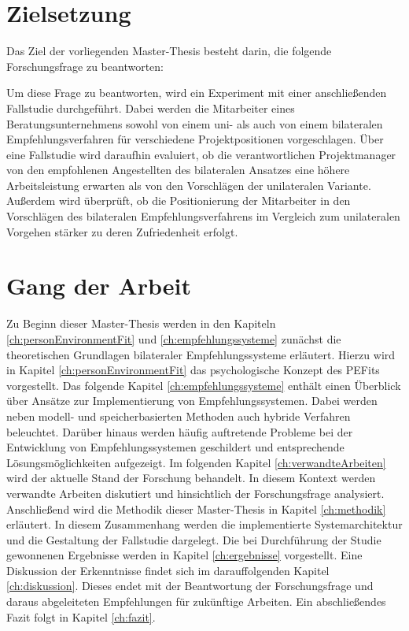 \newpage
\section{Zielsetzung}
\label{sec:intro:zielsetzung}
Das Ziel der vorliegenden Master-Thesis besteht darin, die folgende Forschungsfrage zu beantworten:

\forschungsfrage

Um diese Frage zu beantworten, wird ein Experiment mit einer anschließenden Fallstudie durchgeführt. Dabei werden die Mitarbeiter eines Beratungsunternehmens sowohl von einem uni- als auch von einem bilateralen Empfehlungsverfahren für verschiedene Projektpositionen vorgeschlagen. Über eine Fallstudie wird daraufhin evaluiert, ob die verantwortlichen Projektmanager von den empfohlenen Angestellten des bilateralen Ansatzes eine höhere Arbeitsleistung erwarten als von den Vorschlägen der unilateralen Variante. Außerdem wird überprüft, ob die Positionierung der Mitarbeiter in den Vorschlägen des bilateralen Empfehlungsverfahrens im Vergleich zum unilateralen Vorgehen stärker zu deren Zufriedenheit erfolgt.

\section{Gang der Arbeit}
\label{sec:intro:gangDerArbeit}
Zu Beginn dieser Master-Thesis werden in den Kapiteln \ref{ch:personEnvironmentFit} und \ref{ch:empfehlungssysteme} zunächst die theoretischen Grundlagen bilateraler Empfehlungssysteme erläutert. Hierzu wird in Kapitel \ref{ch:personEnvironmentFit} das psychologische Konzept des \aclp{PEFit} vorgestellt. Das folgende Kapitel \ref{ch:empfehlungssysteme} enthält einen Überblick über Ansätze zur Implementierung von Empfehlungssystemen. Dabei werden neben modell- und speicherbasierten Methoden auch hybride Verfahren beleuchtet. Darüber hinaus werden häufig auftretende Probleme bei der Entwicklung von Empfehlungssystemen geschildert und entsprechende Lösungsmöglichkeiten aufgezeigt. Im folgenden Kapitel \ref{ch:verwandteArbeiten} wird der aktuelle Stand der Forschung behandelt. In diesem Kontext werden verwandte Arbeiten diskutiert und hinsichtlich der Forschungsfrage analysiert. Anschließend wird die Methodik dieser Master-Thesis in Kapitel \ref{ch:methodik} erläutert. In diesem Zusammenhang werden die implementierte Systemarchitektur und die Gestaltung der Fallstudie dargelegt. Die bei Durchführung der Studie gewonnenen Ergebnisse werden in Kapitel \ref{ch:ergebnisse} vorgestellt. Eine Diskussion der Erkenntnisse findet sich im darauffolgenden Kapitel \ref{ch:diskussion}. Dieses endet mit der Beantwortung der Forschungsfrage und daraus abgeleiteten Empfehlungen für zukünftige Arbeiten. Ein abschließendes Fazit folgt in Kapitel \ref{ch:fazit}.
